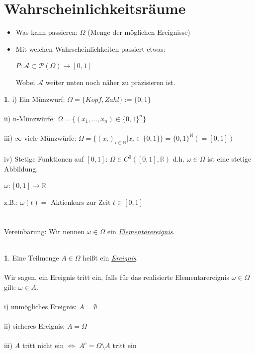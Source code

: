 \documentclass[10pt,a4paper]{report}
\numberwithin{equation}{section}
\numberwithin{figure}{section}
\theoremstyle{plain}
\theoremstyle{definition}
\newtheorem{defn}{\protect\definitionname}[section]
\theoremstyle{plain}
\theoremstyle{definition}
\newtheorem{example}{\protect\examplename}[section]
\theoremstyle{remark}
\theoremstyle{plain}
\theoremstyle{plain}
\theoremstyle{plain}
\theoremstyle{plain}
\theoremstyle{plain}
\providecommand{\definitionname}{Definition}
\providecommand{\examplename}{Beispiel}
\newcommand{\1}{ \mathbb{1} } %
\begin{document}
\section{Wahrscheinlichkeitsräume}
\label{sec:wraeume}
\begin{itemize}
\item Was kann passieren: $\Omega$ (Menge der möglichen Ereignisse)
\item Mit welchen Wahrscheinlichkeiten passiert etwas:
\begin{center}
$P: \mathcal{A} \subset \mathcal{P}(\Omega) \rightarrow [0,1]$
\end{center}
Wobei $\mathcal{A}$ weiter unten noch näher zu präzisieren ist.
\end{itemize}
\begin{example}
  i) Ein Münzwurf: $\Omega=\{Kopf, Zahl\}:=\{0,1\}$\\\\
  ii) n-Münzwürfe: $\Omega=\{(x_1,\dots,x_n) \in \{0,1\}^n\}$\\\\
  iii) $\infty$-viele Münzwürfe: $\Omega=\{(x_i)_{i\in \mathbb{N}}|x_i \in \{0,1\}\}=\{0,1\}^\mathbb{N}(=[0,1])$\\\\
  iv) Stetige Funktionen auf $[0,1]$: $\Omega \in
  C^0([0,1],\mathbb{R})$ d.h. $\omega \in \Omega$ ist eine stetige
  Abbildung.
  \begin{center}
    $\omega: [0,1] \rightarrow \mathbb{R}$
  \end{center}
  z.B.: $\omega(t)=$ Aktienkurs zur Zeit $t \in [0,1]$\\\\\\
  Vereinbarung: Wir nennen $\omega \in \Omega$ ein \underline{\textit{Elementarereignis}}.\\\\
\end{example}
\begin{defn}
  Eine Teilmenge $A \in \Omega$ heißt ein \underline{\textit{Ereignis}}.\\\\
  Wir sagen, ein Ereignis tritt ein, falls für das realisierte Elementarereignis $\omega \in \Omega$ gilt: $\omega \in A$.\\\\
  i) unmögliches Ereignis: $A=\emptyset$\\\\
  ii) sicheres Ereignis: $A=\Omega$\\\\
  iii) $A$ tritt nicht ein $\Leftrightarrow$ $A^c=\Omega\setminus A$ tritt ein \\\\
\end{defn}
\end{document}
